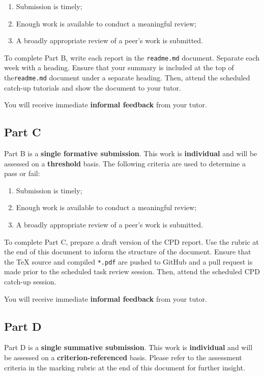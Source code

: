 \documentclass{../fal_assignment}
\begin{document}
\begin{enumerate}[label=(\alph*)]
	\item Submission is timely;
	\item Enough work is available to conduct a meaningful review;
	\item A broadly appropriate review of a peer's work is submitted.
\end{enumerate}

To complete Part B, write each report in the \texttt{readme.md} document. Separate each week with a heading. Ensure that your summary is included at the top of the\texttt{readme.md} document under a separate heading. Then, attend the scheduled catch-up tutorials and show the document to your tutor. 

You will receive immediate \textbf{informal feedback} from your tutor.

\subsection*{Part C}

Part B is a \textbf{single formative submission}. This work is \textbf{individual} and will be assessed on a \textbf{threshold} basis. The following criteria are used to determine a pass or fail:

\begin{enumerate}[label=(\alph*)]
	\item Submission is timely;
	\item Enough work is available to conduct a meaningful review;
	\item A broadly appropriate review of a peer's work is submitted.
\end{enumerate}

To complete Part C, prepare a draft version of the CPD report. Use the rubric at the end of this document to inform the structure of the document. Ensure that the TeX source and compiled \texttt{*.pdf} are pushed to GitHub and a pull request is made prior to the scheduled task review session. Then, attend the scheduled CPD catch-up session.

You will receive immediate \textbf{informal feedback} from your tutor.

\subsection*{Part D}

Part D is a \textbf{single summative submission}. This work is \textbf{individual} and will be assessed on a \textbf{criterion-referenced} basis. Please refer to the assessment criteria in the marking rubric at the end of this document for further insight.
\end{document}

